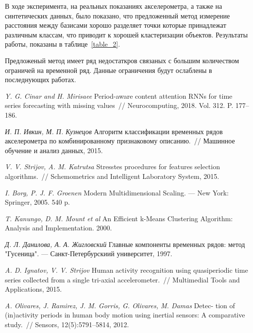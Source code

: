 \documentclass[12pt, twoside]{article}
\begin{document}
В ходе эксперимента, на реальных показаниях акселерометра, а также на синтетических данных, было показано, что предложенный метод измерение расстояния между базисами хорошо разделяет точки которые принадлежат различным классам, что приводит к хорошей кластеризации объектов. Результаты работы, показаны в таблице~\ref{table_2}.

Предложеный метод имеет ряд недостаткров связаных с большим количеством ограничей на временной ряд. Данные ограничения будут ослаблены в последнующих работах.

\begin{thebibliography}{99}
	\textit{Y. G. Cinar and H. Mirisaee} Period-aware content attention RNNs for time series forecasting with missing values~// Neurocomputing, 2018. Vol. 312. P. 177--186.
	
	\textit{И. П. Ивкин,  М. П. Кузнецов} Алгоритм классификации временных рядов акселерометра по комбинированному признаковому описанию.~// Машинное обучение и анализ данных, 2015.
	
	\textit{V. V. Strijov, A. M. Katrutsa} Stresstes procedures for features selection algorithms.~// Schemometrics and Intelligent Laboratory System, 2015.
	
	\textit{I. Borg, P. J. F. Groenen} Modern Multidimensional Scaling. --- New York: Springer, 2005. 540 p.
	
	\textit{T. Kanungo, D. M. Mount et al} An Efficient k-Means Clustering Algorithm: Analysis and Implementation. 2000.
	
	\textit{Д. Л. Данилова, А. А. Жигловский} Главные компоненты временных рядов: метод "Гусеница". --- Санкт-Петербурскиий университет, 1997.
	
	\textit{A. D. Ignatov, V. V. Strijov} Human activity recognition using quasiperiodic time series collected from a single tri-axial accelerometer.~// Multimedial Tools and Applications, 2015.
	
	\textit{A. Olivares, J. Ramirez, J. M. Gorris, G. Olivares, M. Damas} Detec- tion of (in)activity periods in human body motion using inertial sensors: A comparative study.~// Sensors, 12(5):5791–5814, 2012.

	
\end{thebibliography}
\end{document}
